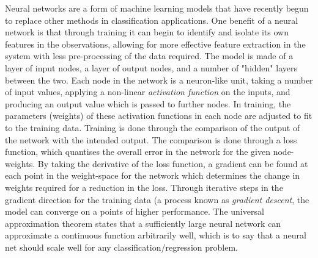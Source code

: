 Neural networks are a form of machine learning models that have recently begun to replace other methods in classification applications. One benefit of a neural network is that through training it can begin to identify and isolate its own features in the observations, allowing for more effective feature extraction in the system with less pre-processing of the data required. The model is made of a layer of input nodes, a layer of output nodes, and a number of "hidden" layers between the two. Each node in the network is a neuron-like unit, taking a number of input values, applying a non-linear \emph{activation function} on the inputs, and producing an output value which is passed to further nodes. In training, the parameters (weights) of these activation functions in each node are adjusted to fit to the training data. Training is done through the comparison of the output of the network with the intended output. The comparison is done through a loss function, which quantises the overall error in the network for the given node-weights. By taking the derivative of the loss function, a gradient can be found at each point in the weight-space for the network which determines the change in weights required for a reduction in the loss. Through iterative steps in the gradient direction for the training data (a process known as \emph{gradient descent}, the model can converge on a points of higher performance. The universal approximation theorem states that a sufficiently large neural network can approximate a continuous function arbitrarily well, which is to say that a neural net should scale well for any classification/regression problem.
